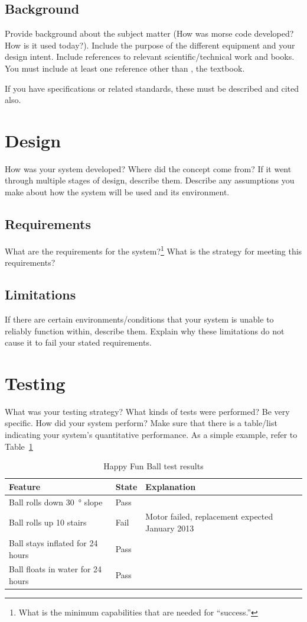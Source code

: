 \documentclass[12pt, svn, draft]{rureport}
\begin{document}
\subsection{Background}
Provide background about the subject matter (How was morse code
developed?  How is it used today?). Include the purpose of the
different equipment and your design intent. Include references to
relevant scientific/technical work and books.  You must include at
least one reference other than \cite{carryer2011IntroMechatronics},
the textbook.

If you have specifications or related standards, these must be
described and cited also.


\section{Design}
How was your system developed?  Where did the concept come from?  If
it went through multiple stages of design, describe them. Describe any
assumptions you make about how the system will be used and its
environment.

\subsection{Requirements}
What are the requirements for the system?\footnote{What is the minimum
capabilities that are needed for ``success.''}  What is the strategy
for meeting this requirements?


\subsection{Limitations\label{Limitations}}
If there are certain environments/conditions that your system is
unable to reliably function within, describe them.  Explain why these
limitations do not cause it to fail your stated requirements.

\section{Testing}
What was your testing strategy?  What kinds of tests were performed? Be very specific.  How did your system perform?  Make sure that there is a table/list indicating your system's quantitative performance. As a simple example, refer to Table~\ref{table:testing}

\begin{table}
\centering
\begin{tabular}{|l|l|l|}\hline
{\bf Feature} &{\bf State} &{\bf Explanation}\\\hline
Ball rolls down \SI{30}{\degree} slope &Pass &\\\hline
Ball rolls up 10 stairs   &Fail &Motor failed, replacement expected January 2013\\\hline
Ball stays inflated for 24 hours &Pass &\\\hline
Ball floats in water for 24 hours &Pass &\\\hline
\end{tabular}
\caption{Happy Fun Ball test results \label{table:testing}}
\end{table}
\end{document}
